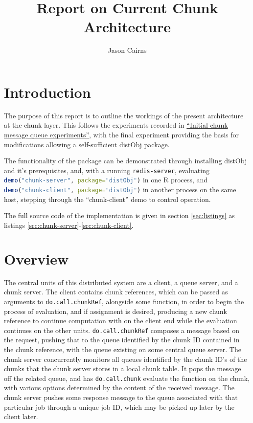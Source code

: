 \documentclass[a4paper,10pt]{article}
\begin{document}
\title{Report on Current Chunk Architecture}
\author{Jason Cairns}
  
\maketitle

\section{Introduction}

The purpose of this report is to outline the workings of the present
architecture at the chunk layer.
This follows the experiments recorded in
\href{init-chunk-msg-q-exp.pdf}{``Initial chunk message queue experiments''},
with the final experiment providing the basis for modifications allowing a
self-sufficient distObj package.

The functionality of the package can be demonstrated through installing distObj
and it's prerequisites, and, with a running \texttt{redis-server}, evaluating
\lstinline[language=R]{demo("chunk-server", package="distObj")} in one R
process, and \lstinline[language=R]{demo("chunk-client", package="distObj")} in
another process on the same host, stepping through the ``chunk-client'' demo to
control operation.



The full source code of the implementation is given in section
\ref{sec:listings} as listings \ref{src:chunk-server}-\ref{src:chunk-client}.

\section{Overview}

The central units of this distributed system are a client, a queue server, and
a chunk server.
The client contains chunk references, which can be passed as arguments to
\texttt{do.call.chunkRef}, alongside some function, in order to begin the
process of evaluation, and if assignment is desired, producing a new chunk
reference to continue computation with on the client end while the evaluation
continues on the other units.
\texttt{do.call.chunkRef} composes a message based on the request, pushing that
to the queue identified by the chunk ID contained in the chunk reference, with
the queue existing on some central queue server.
The chunk server concurrently monitors all queues identified by the chunk ID's
of the chunks that the chunk server stores in a local chunk table.
It pops the message off the related queue, and has \texttt{do.call.chunk}
evaluate the function on the chunk, with various options determined by the
content of the received message.
The chunk server pushes some response message to the queue associated with that
particular job through a unique job ID, which may be picked up later by the
client later.
\end{document}
